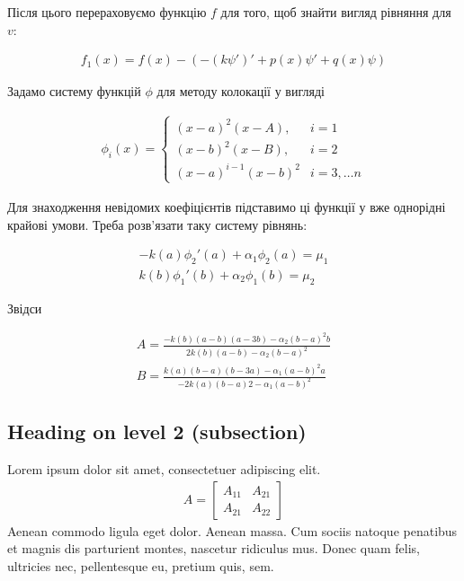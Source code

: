 Після цього перераховуємо функцію  $f$ для того, щоб знайти вигляд рівняння для $v$:
	
	\begin{equation}
	\begin{split}
	f_1(x) = f(x) - \left( -(k\psi')' + p(x)\psi' + q(x)\psi \right)
	\end{split}
	\end{equation}
	
Задамо систему функцій $\phi$ для методу колокації у вигляді 

	\begin{align}
	\phi_i(x) = 
	\begin{cases}
	(x - a)^2(x - A), & i = 1 \\ 
	(x - b)^2(x - B), & i = 2 \\
	(x - a)^{i -1}(x - b)^2 & i = 3, \dots n
	\end{cases}
	\end{align}

Для знаходження невідомих коефіцієнтів підставимо ці функції у вже однорідні крайові умови. Треба розв'язати таку систему рівнянь: 
	
	\begin{equation}
	\begin{split}
	-k(a)\phi_2'(a) + \alpha_1 \phi_2(a) = \mu_1 \\ 
	k(b)\phi_1'(b) + \alpha_2 \phi_1(b) = \mu_2
	\end{split}
	\end{equation}
	
Звідси

	\begin{equation}
	\begin{split}
	A = \frac{-k(b)(a-b)(a-3b) - \alpha_2(b-a)^2b}{2k(b)(a-b) - \alpha_2(b-a)^2} \\
	B = \frac{k(a)(b-a)(b-3a) - \alpha_1(a-b)^2a}{-2k(a)(b-a)2 - \alpha_1(a-b)^2}
	\end{split}
	\end{equation}


\subsection{Heading on level 2 (subsection)}

Lorem ipsum dolor sit amet, consectetuer adipiscing elit. 
\begin{align}
A = 
\begin{bmatrix}
A_{11} & A_{21} \\
A_{21} & A_{22}
\end{bmatrix}
\end{align}
Aenean commodo ligula eget dolor. Aenean massa. Cum sociis natoque penatibus et magnis dis parturient montes, nascetur ridiculus mus. Donec quam felis, ultricies nec, pellentesque eu, pretium quis, sem.

